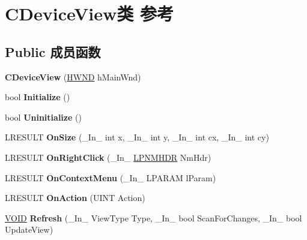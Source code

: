 \hypertarget{class_c_device_view}{}\section{C\+Device\+View类 参考}
\label{class_c_device_view}
\subsection*{Public 成员函数}
\begin{DoxyCompactItemize}
\item 
\mbox{\label{class_c_device_view_ad03656dea490ff71c2aa43a3d75d1d7b}} 
{\bfseries C\+Device\+View} (\hyperlink{interfacevoid}{H\+W\+ND} h\+Main\+Wnd)
\item 
\mbox{\label{class_c_device_view_ae52bd2d4ddf8d3ebbd8adbfc0079e9ae}} 
bool {\bfseries Initialize} ()
\item 
\mbox{\label{class_c_device_view_ad1402f89116ae5e2ca10ed80d4ff4b85}} 
bool {\bfseries Uninitialize} ()
\item 
\mbox{\label{class_c_device_view_a2ce4b391148946229c43d21cc280fe42}} 
L\+R\+E\+S\+U\+LT {\bfseries On\+Size} (\+\_\+\+In\+\_\+ int x, \+\_\+\+In\+\_\+ int y, \+\_\+\+In\+\_\+ int cx, \+\_\+\+In\+\_\+ int cy)
\item 
\mbox{\label{class_c_device_view_ae289ff245bbbeced1c1e460f0c15ffcd}} 
L\+R\+E\+S\+U\+LT {\bfseries On\+Right\+Click} (\+\_\+\+In\+\_\+ \hyperlink{structtag_n_m_h_d_r}{L\+P\+N\+M\+H\+DR} Nm\+Hdr)
\item 
\mbox{\label{class_c_device_view_af42786ae8d330dd434b3dde5532de9a6}} 
L\+R\+E\+S\+U\+LT {\bfseries On\+Context\+Menu} (\+\_\+\+In\+\_\+ L\+P\+A\+R\+AM l\+Param)
\item 
\mbox{\label{class_c_device_view_adc4273a513dd802345f4ce3d026fca1e}} 
L\+R\+E\+S\+U\+LT {\bfseries On\+Action} (U\+I\+NT Action)
\item 
\mbox{\label{class_c_device_view_ac195f2220bd3774bff213ccd30ea2c6b}} 
\hyperlink{interfacevoid}{V\+O\+ID} {\bfseries Refresh} (\+\_\+\+In\+\_\+ View\+Type Type, \+\_\+\+In\+\_\+ bool Scan\+For\+Changes, \+\_\+\+In\+\_\+ bool Update\+View)

\end{DoxyCompactItemize}
